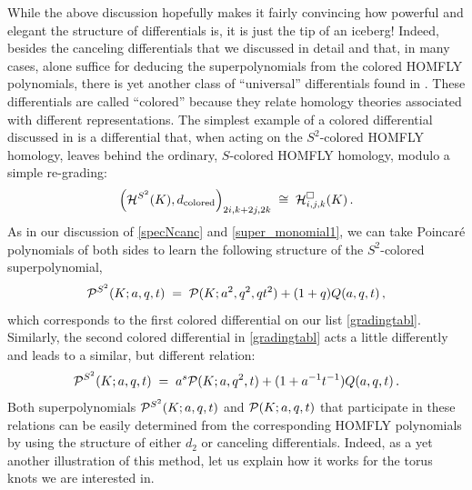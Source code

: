 \documentclass[hyper,letterpaper]{JHEP3}
\newcommand{\be}{\begin{equation}}
\newcommand{\ee}{\end{equation}}
\newcommand{\cH}{{\cal H }}
\renewcommand{\P}{{\cal P}}
\begin{document}
While the above discussion hopefully makes it fairly convincing
how powerful and elegant the structure of differentials is, it is just the tip of an iceberg!
Indeed, besides the canceling differentials that we discussed in detail and that, in many cases,
alone suffice for deducing the superpolynomials from the colored HOMFLY polynomials,
there is yet another class of ``universal'' differentials found in \cite{GS}.
These differentials are called ``colored'' because they relate homology theories
associated with different representations.
The simplest example of a colored differential discussed in \cite{GS}
is a differential that, when acting on the $S^2$-colored HOMFLY homology,
leaves behind the ordinary, $S$-colored HOMFLY homology, modulo a simple re-grading:
\be
\left( \cH^{S^2} (K) , d_{\text{colored}} \right)_{2i,k+2j,2k} \; \cong \; \cH^{\Box}_{i,j,k} (K) \,.
\ee
As in our discussion of \eqref{specNcanc} and \eqref{super_monomial1},
we can take Poincar\'e polynomials of both sides to learn the following structure
of the $S^2$-colored superpolynomial,
\be
\P^{S^2} (K; a,q,t) \; = \; \P (K; a^2,q^2, q t^2) + (1 + q) Q (a,q,t) \,,
\label{coloredPa}
\ee
which corresponds to the first colored differential on our list \eqref{gradingtabl}.
Similarly, the second colored differential in \eqref{gradingtabl} acts a little differently
and leads to a similar, but different relation:
\be
\P^{S^2} (K; a,q,t) \; = \; a^{s} \P (K; a,q^2, t) + (1 + a^{-1} t^{-1}) Q (a,q,t) \,.
\label{coloredPb}
\ee
Both superpolynomials $\P^{S^2} (K; a,q,t)$ and $\P (K; a,q,t)$ that participate
in these relations can be easily determined from the corresponding HOMFLY polynomials
by using the structure of either $d_2$ or canceling differentials.
Indeed, as a yet another illustration of this method,
let us explain how it works for the torus knots we are interested in.
\end{document}
